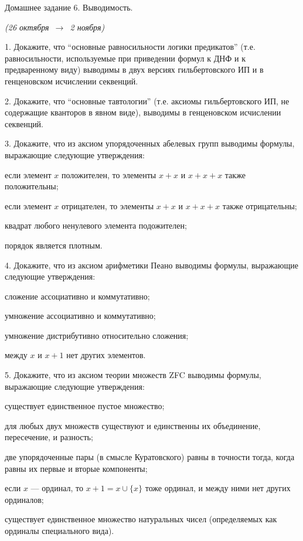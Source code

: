 \documentclass[a4paper,11pt]{article}
\begin{document}
\begin{center}
	{\Large Домашнее задание 6. Выводимость.}

	{\it (26 октября\ \(\to\)\ 2 ноября)}
\end{center}


1. Докажите, что ``основные равносильности логики предикатов'' (т.е. равносильности, используемые при приведении формул к ДНФ и к предваренному виду) выводимы в двух версиях гильбертовского ИП и в генценовском исчислении секвенций.
\medskip

2. Докажите, что ``основные тавтологии'' (т.е. аксиомы гильбертовского ИП, не содержащие кванторов в явном виде), выводимы в генценовском исчислении секвенций. 
\medskip

3. Докажите, что из аксиом упорядоченных абелевых групп выводимы формулы, выражающие следующие утверждения:

если элемент $x$ положителен, то элементы $x+x$ и $x+x+x$ также положительны;

если элемент $x$ отрицателен, то элементы $x+x$ и $x+x+x$ также отрицательны;

квадрат любого ненулевого элемента подожителен;

порядок является плотным. 
\medskip

4. Докажите, что из аксиом арифметики Пеано выводимы формулы, выражающие следующие утверждения:

сложение ассоциативно и коммутативно;

умножение ассоциативно и коммутативно;

умножение дистрибутивно относительно сложения;

между $x$ и $x+1$ нет других элементов.
\medskip

5. Докажите, что из аксиом теории множеств ZFC выводимы формулы, выражающие следующие утверждения:

существует единственное пустое множество;

для любых двух множеств существуют и единственны их объединение, пересечение, и разность;

две упорядоченные пары (в смысле Куратовского) равны в точности тогда, когда равны их первые и вторые компоненты;

если  $x$ --- ординал, то  $x+1=x\cup\{x\}$ тоже ординал, и между ними нет других ординалов;

существует единственное множество натуральных чисел (определяемых как ординалы специального вида). 
\end{document}
